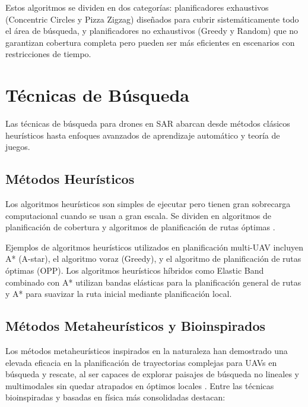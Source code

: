 Estos algoritmos se dividen en dos categorías: planificadores exhaustivos (Concentric Circles y Pizza Zigzag) diseñados para cubrir sistemáticamente todo el área de búsqueda, y planificadores no exhaustivos (Greedy y Random) que no garantizan cobertura completa pero pueden ser más eficientes en escenarios con restricciones de tiempo.

\section{Técnicas de Búsqueda}

Las técnicas de búsqueda para drones en SAR abarcan desde métodos clásicos heurísticos hasta enfoques avanzados de aprendizaje automático y teoría de juegos.

\subsection{Métodos Heurísticos}

Los algoritmos heurísticos son simples de ejecutar pero tienen gran sobrecarga computacional cuando se usan a gran escala. Se dividen en algoritmos de planificación de cobertura y algoritmos de planificación de rutas óptimas \cite{tan2021}.

Ejemplos de algoritmos heurísticos utilizados en planificación multi-UAV incluyen A* (A-star), el algoritmo voraz (Greedy), y el algoritmo de planificación de rutas óptimas (OPP). Los algoritmos heurísticos híbridos como Elastic Band combinado con A* utilizan bandas elásticas para la planificación general de rutas y A* para suavizar la ruta inicial mediante planificación local.

\subsection{Métodos Metaheurísticos y Bioinspirados}

Los métodos metaheurísticos inspirados en la naturaleza han demostrado una elevada eficacia en la planificación de trayectorias complejas para UAVs en búsqueda y rescate, al ser capaces de explorar paisajes de búsqueda no lineales y multimodales sin quedar atrapados en óptimos locales \cite{alqudsi2025, guo2025}. Entre las técnicas bioinspiradas y basadas en física más consolidadas destacan:

